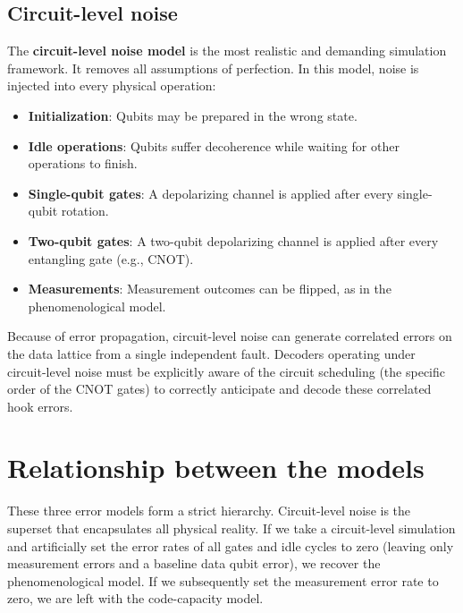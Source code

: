\subsection{Circuit-level noise}
 The \textbf{circuit-level noise model} is the most realistic and demanding simulation framework. It removes all assumptions of perfection. In this model, noise is injected into every physical operation:
\begin{itemize}
    \item \textbf{Initialization}: Qubits may be prepared in the wrong state.
    \item \textbf{Idle operations}: Qubits suffer decoherence while waiting for other operations to finish.
    \item \textbf{Single-qubit gates}: A depolarizing channel is applied after every single-qubit rotation.
    \item \textbf{Two-qubit gates}: A two-qubit depolarizing channel is applied after every entangling gate (e.g., CNOT).
    \item \textbf{Measurements}: Measurement outcomes can be flipped, as in the phenomenological model.
\end{itemize}

Because of error propagation, circuit-level noise can generate correlated errors on the data lattice from a single independent fault. Decoders operating under circuit-level noise must be explicitly aware of the circuit scheduling (the specific order of the CNOT gates) to correctly anticipate and decode these correlated hook errors.

\section{Relationship between the models}
 These three error models form a strict hierarchy. Circuit-level noise is the superset that encapsulates all physical reality. If we take a circuit-level simulation and artificially set the error rates of all gates and idle cycles to zero (leaving only measurement errors and a baseline data qubit error), we recover the phenomenological model. If we subsequently set the measurement error rate to zero, we are left with the code-capacity model.

